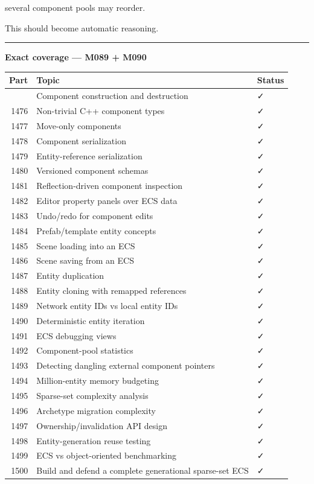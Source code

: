 several component pools may reorder.

This should become automatic reasoning.

\begin{center}\rule{0.5\linewidth}{0.5pt}\end{center}

\textbf{Exact coverage --- M089 + M090}

{\def\LTcaptype{none} %
\begin{longtable}[]{@{}rll@{}}
\toprule\noalign{}
Part & Topic & Status \\
\midrule\noalign{}
\endhead
\bottomrule\noalign{}
\endlastfoot
1475 & Component construction and destruction & ✓ \\
1476 & Non-trivial C++ component types & ✓ \\
1477 & Move-only components & ✓ \\
1478 & Component serialization & ✓ \\
1479 & Entity-reference serialization & ✓ \\
1480 & Versioned component schemas & ✓ \\
1481 & Reflection-driven component inspection & ✓ \\
1482 & Editor property panels over ECS data & ✓ \\
1483 & Undo/redo for component edits & ✓ \\
1484 & Prefab/template entity concepts & ✓ \\
1485 & Scene loading into an ECS & ✓ \\
1486 & Scene saving from an ECS & ✓ \\
1487 & Entity duplication & ✓ \\
1488 & Entity cloning with remapped references & ✓ \\
1489 & Network entity IDs vs local entity IDs & ✓ \\
1490 & Deterministic entity iteration & ✓ \\
1491 & ECS debugging views & ✓ \\
1492 & Component-pool statistics & ✓ \\
1493 & Detecting dangling external component pointers & ✓ \\
1494 & Million-entity memory budgeting & ✓ \\
1495 & Sparse-set complexity analysis & ✓ \\
1496 & Archetype migration complexity & ✓ \\
1497 & Ownership/invalidation API design & ✓ \\
1498 & Entity-generation reuse testing & ✓ \\
1499 & ECS vs object-oriented benchmarking & ✓ \\
1500 & Build and defend a complete generational sparse-set ECS & ✓ \\
\end{longtable}
}

